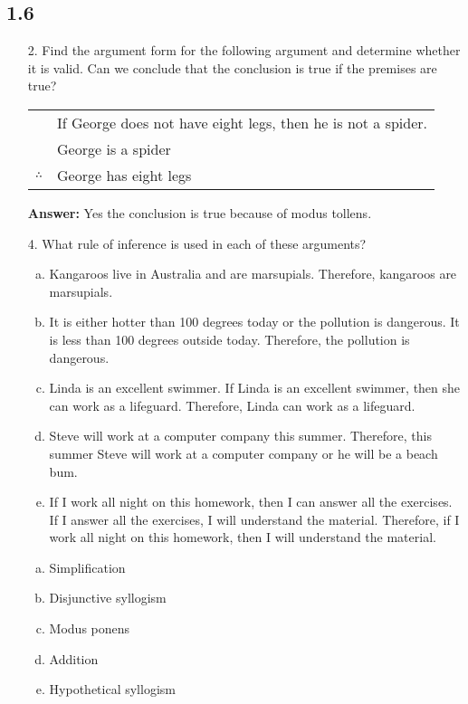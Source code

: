 \subsection{1.6}
\begin{itemize}
    \item[2.] Find the argument form for the following argument and determine whether it is valid. Can we conclude that the conclusion is true if the premises are true?
          \vspace{5mm} %

          \begin{tabular}{rl}
                           & If George does not have eight legs, then he is not a spider. \\
                           & George is a spider                                           \\
              \hline
              $\therefore$ & George has eight legs \vspace{3mm}                           %
          \end{tabular}

          \textbf{Answer: }
          Yes the conclusion is true because of modus tollens.

    \item[4.] What rule of inference is used in each of these arguments?
          \begin{enumerate}[a.]
              \item Kangaroos live in Australia and are marsupials. Therefore, kangaroos are marsupials.
              \item It is either hotter than 100 degrees today or the pollution is dangerous. It is less than 100 degrees outside today. Therefore, the pollution is dangerous.
              \item Linda is an excellent swimmer. If Linda is an excellent swimmer, then she can work as a lifeguard. Therefore, Linda can work as a lifeguard.
              \item Steve will work at a computer company this summer. Therefore, this summer Steve will work at a computer company or he will be a beach bum.
              \item If I work all night on this homework, then I can answer all the exercises. If I answer all the exercises, I will understand the material. Therefore, if I work all night on this homework, then I will understand the material.
          \end{enumerate}
          \answer
          \begin{enumerate}[a.]
              \item Simplification
              \item Disjunctive syllogism
              \item Modus ponens
              \item Addition
              \item Hypothetical syllogism
          \end{enumerate}


\end{itemize}
